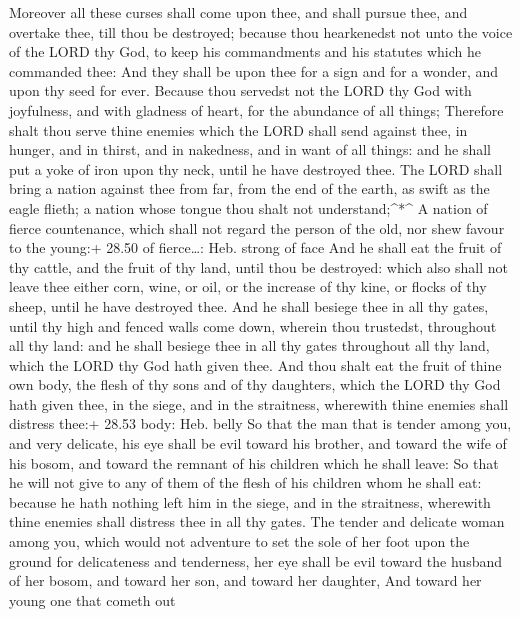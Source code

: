  Moreover all these curses shall come upon thee, and shall
pursue thee, and overtake thee, till thou be destroyed; because thou
hearkenedst not unto the voice of the LORD thy God, to keep his
commandments and his statutes which he commanded thee:  And
they shall be upon thee for a sign and for a wonder, and upon thy seed
for ever.  Because thou servedst not the LORD thy God with
joyfulness, and with gladness of heart, for the abundance of all things;
 Therefore shalt thou serve thine enemies which the LORD
shall send against thee, in hunger, and in thirst, and in nakedness, and
in want of all things: and he shall put a yoke of iron upon thy neck,
until he have destroyed thee.  The LORD shall bring a
nation against thee from far, from the end of the earth, as swift as the
eagle flieth; a nation whose tongue thou shalt not understand;\^{}*\^{}
 A nation of fierce countenance, which shall not regard the
person of the old, nor shew favour to the young:+ 28.50 of fierce\ldots:
Heb. strong of face  And he shall eat the fruit of thy
cattle, and the fruit of thy land, until thou be destroyed: which also
shall not leave thee either corn, wine, or oil, or the increase of thy
kine, or flocks of thy sheep, until he have destroyed thee.
 And he shall besiege thee in all thy gates, until thy high
and fenced walls come down, wherein thou trustedst, throughout all thy
land: and he shall besiege thee in all thy gates throughout all thy
land, which the LORD thy God hath given thee.  And thou
shalt eat the fruit of thine own body, the flesh of thy sons and of thy
daughters, which the LORD thy God hath given thee, in the siege, and in
the straitness, wherewith thine enemies shall distress thee:+ 28.53
body: Heb. belly  So that the man that is tender among you,
and very delicate, his eye shall be evil toward his brother, and toward
the wife of his bosom, and toward the remnant of his children which he
shall leave:  So that he will not give to any of them of
the flesh of his children whom he shall eat: because he hath nothing
left him in the siege, and in the straitness, wherewith thine enemies
shall distress thee in all thy gates.  The tender and
delicate woman among you, which would not adventure to set the sole of
her foot upon the ground for delicateness and tenderness, her eye shall
be evil toward the husband of her bosom, and toward her son, and toward
her daughter,  And toward her young one that cometh out

